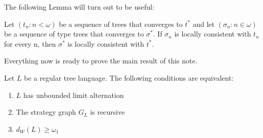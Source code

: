 \documentclass{llncs}
\begin{document}
The following Lemma will turn out to be useful:

\begin{lemma}\label{lemma:limit}
Let $(t_n: n <\omega)$ be a sequence of trees that converges to $t^*$ and let $(\sigma_n: n \in \omega)$ be a sequence of type trees that converges to $\sigma^*$. If $\sigma_n$ is locally consistent with $t_n$ for every n, then $\sigma^*$ is locally consistent with $t^*$.
\end{lemma}

Everything now is ready to prove the main result of this note.

\begin{theorem}
Let $L$ be a regular tree language. The following conditions are equivalent:
\begin{enumerate}



\item $L$ has unbounded limit alternation
\item The strategy graph $G_L$ is recursive
\item $d_W(L) \geq \omega_1$



\end{enumerate}
\end{theorem}
\end{document}
